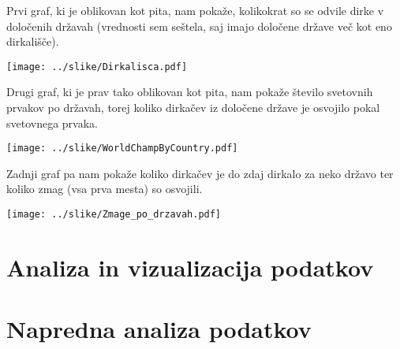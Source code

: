 \documentclass[11pt,a4paper]{article}
\begin{document}
Prvi graf, ki je oblikovan kot pita, nam pokaže, kolikokrat so se odvile dirke v določenih državah (vrednosti sem seštela, saj imajo določene države več kot eno dirkališče).

\texttt{[image: ../slike/Dirkalisca.pdf]}

Drugi graf, ki je prav tako oblikovan kot pita, nam pokaže število svetovnih prvakov po državah, torej koliko dirkačev iz določene države je osvojilo pokal svetovnega prvaka.

\texttt{[image: ../slike/WorldChampByCountry.pdf]}

Zadnji graf pa nam pokaže koliko dirkačev je do zdaj dirkalo za neko državo ter koliko zmag (vsa prva mesta) so osvojili.

\texttt{[image: ../slike/Zmage\_po\_drzavah.pdf]}

\section{Analiza in vizualizacija podatkov}


\section{Napredna analiza podatkov}

\end{document}

